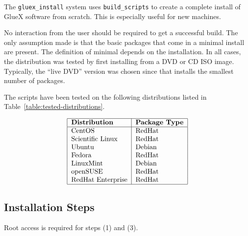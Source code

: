 \documentclass[12pt]{article}
\begin{document}
The {\tt gluex\_install} system uses {\tt build\_scripts} to create a
complete install of GlueX software from scratch. This is especially
useful for new machines.

No interaction from the user should be required to get a successful
build. The only assumption made is that the basic packages that come
in a minimal install are present. The definition of minimal
depends on the installation. In all cases, the distribution was tested
by first installing from a DVD or CD ISO image. Typically, the ``live
DVD'' version was chosen since that installs the smallest number of
packages.

The scripts have been tested on the following distributions listed in
Table~\ref{table:tested-distributions}.

\begin{table}
$$
\begin{tabular}{|l|l|}
\hline
\bf Distribution & \bf Package Type \\
\hline
CentOS & RedHat \\
Scientific Linux & RedHat \\
Ubuntu & Debian \\
Fedora & RedHat \\
LinuxMint & Debian \\
openSUSE & RedHat \\
RedHat Enterprise & RedHat \\
\hline
\end{tabular}
$$
\caption{Gluex\_install tested distributions.}\label{table:tested-distributions}
\end{table}

\subsection{Installation Steps}

Root access is required for steps (1) and (3).
\end{document}
